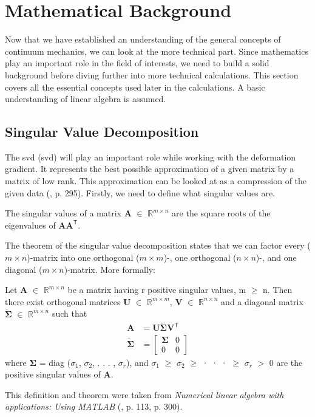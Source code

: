 {\section{Mathematical Background}
\label{s:math_background}
Now that we have established an understanding of the general concepts of continuum mechanics, we can look at the more technical part. Since mathematics play an important role in the field of interests, we need to build a solid background before diving further into more technical calculations. This section covers all the essential concepts used later in the calculations. A basic understanding of linear algebra is assumed.

\subsection{Singular Value Decomposition}
The \acrlong{svd} (\acrshort{svd}) will play an important role while working with the deformation gradient. It represents the best possible approximation of a given matrix by a matrix of low rank. This approximation can be looked at as a compression of the given data (\cite{LiesenMehrmann2015}, p. 295). Firstly, we need to define what singular values are.
\begin{definition}
\label{singular_values}
The singular values of a matrix $\mathbf{A}$ $\in$ $\mathbb{R}^{m \times n}$ are the square roots of the eigenvalues of $\mathbf{AA}^{\mathsf{T}}$.
\end{definition}
The theorem of the singular value decomposition states that we can factor every ($m \times n$)-matrix into one orthogonal ($m \times m$)-, one orthogonal ($n \times n$)-, and one diagonal ($m \times n$)-matrix. More formally:
\begin{theorem}
\label{SVD}
Let $\mathbf{A}$ $\in$ $\mathbb{R}^{m \times n}$ be a matrix having r positive singular values, m $\geq$ n. Then there exist orthogonal matrices $\mathbf{U}$ $\in$ $\mathbb{R}^{m \times m}$, $\mathbf{V}$ $\in$ $\mathbb{R}^{n \times n}$ and a diagonal matrix $\mathbf{\tilde{\Sigma}}$ $\in$ $\mathbb{R}^{m \times n}$ such that
\begin{align*}
\mathbf{A} &= \mathbf{U \tilde{\Sigma} V^\mathsf{T}} \\
\mathbf{\tilde{\Sigma}} &= \left[ \begin{array}{cc} \mathbf{\Sigma} & 0 \\ 0 & 0 \end{array} \right]
\end{align*}
where $\mathbf{\Sigma}$ = diag ($\sigma_1$, $\sigma_2$, . . . , $\sigma_r$), and $\sigma_1$ $\geq$ $\sigma_2$ $\geq$ · · · $\geq$ $\sigma_r$ $>$ 0 are the positive singular values of $\mathbf{A}$.
\end{theorem}
This definition and theorem were taken from \textit{Numerical linear algebra with applications: Using MATLAB} (\cite{ford2014numerical}, p. 113, p. 300).

}
